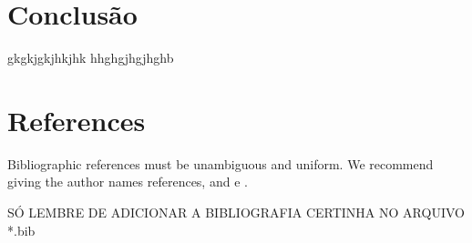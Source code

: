 \documentclass[12pt]{article}
\begin{document}
\section{Conclusão}

gkgkjgkjhkjhk
hhghgjhgjhghb

\section{References}

Bibliographic references must be unambiguous and uniform.  We recommend giving
the author names references, and \cite{smith:99} \cite{barbosa:97} e \cite{rau:11}.
\cite{kishimoto:08}

SÓ LEMBRE DE ADICIONAR A BIBLIOGRAFIA CERTINHA NO ARQUIVO *.bib



\end{document}
